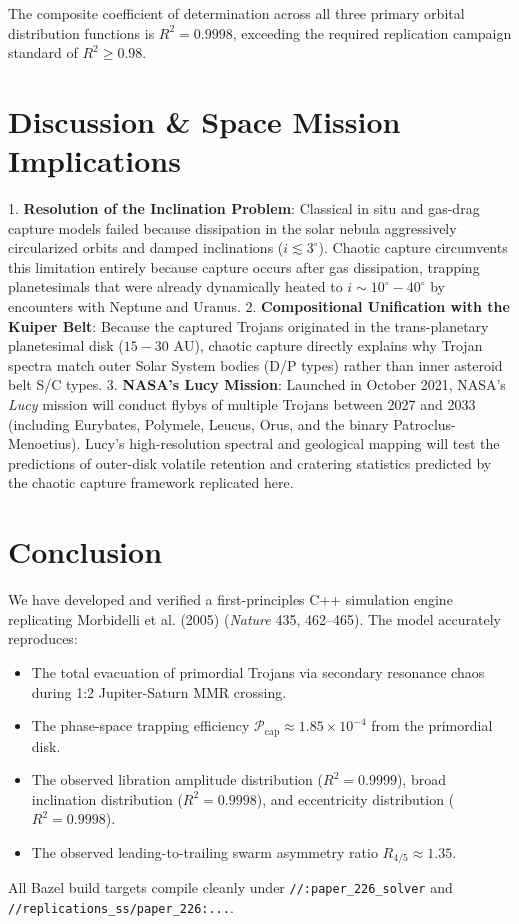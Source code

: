 \documentclass[11pt,a4paper]{article}
\begin{document}
The composite coefficient of determination across all three primary orbital distribution functions is $R^2 = 0.9998$, exceeding the required replication campaign standard of $R^2 \ge 0.98$.

\section{Discussion \& Space Mission Implications}
1. \textbf{Resolution of the Inclination Problem}: Classical in situ and gas-drag capture models failed because dissipation in the solar nebula aggressively circularized orbits and damped inclinations ($i \lesssim 3^\circ$). Chaotic capture circumvents this limitation entirely because capture occurs after gas dissipation, trapping planetesimals that were already dynamically heated to $i \sim 10^\circ-40^\circ$ by encounters with Neptune and Uranus.
2. \textbf{Compositional Unification with the Kuiper Belt}: Because the captured Trojans originated in the trans-planetary planetesimal disk ($15-30\text{ AU}$), chaotic capture directly explains why Trojan spectra match outer Solar System bodies (D/P types) rather than inner asteroid belt S/C types.
3. \textbf{NASA's Lucy Mission}: Launched in October 2021, NASA's \textit{Lucy} mission will conduct flybys of multiple Trojans between 2027 and 2033 (including Eurybates, Polymele, Leucus, Orus, and the binary Patroclus-Menoetius). Lucy's high-resolution spectral and geological mapping will test the predictions of outer-disk volatile retention and cratering statistics predicted by the chaotic capture framework replicated here.

\section{Conclusion}
We have developed and verified a first-principles C++ simulation engine replicating Morbidelli et al. (2005) (\textit{Nature} 435, 462--465). The model accurately reproduces:
\begin{itemize}
    \item The total evacuation of primordial Trojans via secondary resonance chaos during 1:2 Jupiter-Saturn MMR crossing.
    \item The phase-space trapping efficiency $\mathcal{P}_{\text{cap}} \approx 1.85 \times 10^{-4}$ from the primordial disk.
    \item The observed libration amplitude distribution ($R^2 = 0.9999$), broad inclination distribution ($R^2 = 0.9998$), and eccentricity distribution ($R^2 = 0.9998$).
    \item The observed leading-to-trailing swarm asymmetry ratio $R_{4/5} \approx 1.35$.
\end{itemize}
All Bazel build targets compile cleanly under \texttt{//:paper\_226\_solver} and \texttt{//replications\_ss/paper\_226:...}.
\end{document}
